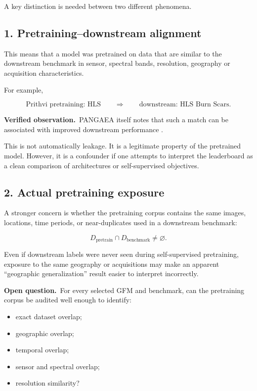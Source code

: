 \documentclass[11pt,a4paper]{article}
\newcommand{\verified}{\textcolor{verifiedgreen}{\textbf{Verified observation.}}}
\newcommand{\openquestion}{\textcolor{questionblue}{\textbf{Open question.}}}
\begin{document}
A key distinction is needed between two different phenomena.

\subsection*{1. Pretraining--downstream alignment}

This means that a model was pretrained on data that are similar to the downstream benchmark
in sensor, spectral bands, resolution, geography or acquisition characteristics.

For example,

\[
\text{Prithvi pretraining: HLS}
\qquad\Longrightarrow\qquad
\text{downstream: HLS Burn Scars}.
\]

\verified\ PANGAEA itself notes that such a match can be associated with improved downstream
performance \cite{pangaea}.

This is not automatically leakage. It is a legitimate property of the pretrained model.
However, it is a confounder if one attempts to interpret the leaderboard as a clean comparison
of architectures or self-supervised objectives.

\subsection*{2. Actual pretraining exposure}

A stronger concern is whether the pretraining corpus contains the same images, locations,
time periods, or near-duplicates used in a downstream benchmark:

\[
D_{\mathrm{pretrain}}\cap D_{\mathrm{benchmark}}\neq\varnothing.
\]

Even if downstream labels were never seen during self-supervised pretraining, exposure to the
same geography or acquisitions may make an apparent ``geographic generalization'' result
easier to interpret incorrectly.

\openquestion\ For every selected GFM and benchmark, can the pretraining corpus be audited
well enough to identify:
\begin{itemize}
    \item exact dataset overlap;
    \item geographic overlap;
    \item temporal overlap;
    \item sensor and spectral overlap;
    \item resolution similarity?
\end{itemize}
\end{document}
